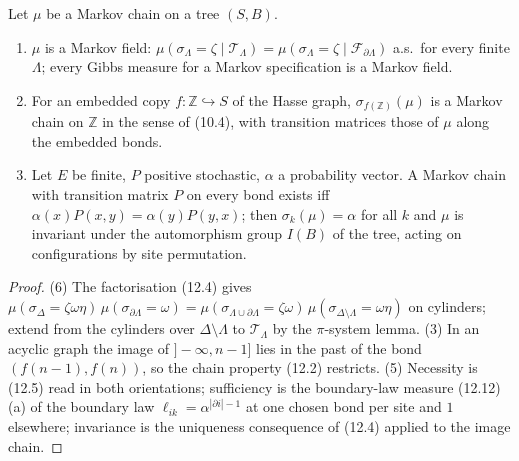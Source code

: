 \begin{proposition}[Georgii (12.3)(3),(5),(6)]
    \label{prop:tr-12-3-b}
    \leanok

    Let $\mu$ be a Markov chain on a tree $(S, B)$.
    \begin{enumerate}
    \item[(6)] $\mu$ is a Markov field: $\mu(\sigma_\Lambda = \zeta \mid \mathcal T_\Lambda) =
      \mu(\sigma_\Lambda = \zeta \mid \mathcal F_{\partial\Lambda})$ a.s.\ for every finite
      $\Lambda$; every Gibbs measure for a Markov specification is a Markov field.
    \item[(3)] For an embedded copy $f : \mathbb Z \hookrightarrow S$ of the Hasse graph,
      $\sigma_{f(\mathbb Z)}(\mu)$ is a Markov chain on $\mathbb Z$ in the sense of (10.4), with
      transition matrices those of $\mu$ along the embedded bonds.
    \item[(5)] Let $E$ be finite, $P$ positive stochastic, $\alpha$ a probability vector. A
      Markov chain with transition matrix $P$ on every bond exists iff $\alpha(x)P(x,y) =
      \alpha(y)P(y,x)$; then $\sigma_k(\mu) = \alpha$ for all $k$ and $\mu$ is invariant under
      the automorphism group $I(B)$ of the tree, acting on configurations by site permutation.
    \end{enumerate}
\end{proposition}
\begin{proof}
    \leanok
    (6) The factorisation (12.4) gives $\mu(\sigma_\Delta = \zeta\omega\eta)\,
    \mu(\sigma_{\partial\Lambda} = \omega) = \mu(\sigma_{\Lambda\cup\partial\Lambda} = \zeta\omega)\,
    \mu(\sigma_{\Delta\setminus\Lambda} = \omega\eta)$ on cylinders; extend from the cylinders
    over $\Delta \setminus \Lambda$ to $\mathcal T_\Lambda$ by the $\pi$-system lemma.
    (3) In an acyclic graph the image of $]-\infty, n-1]$ lies in the past of the bond
    $(f(n-1), f(n))$, so the chain property (12.2) restricts. (5) Necessity is (12.5) read in
    both orientations; sufficiency is the boundary-law measure (12.12)(a) of the boundary law
    $\ell_{ik} = \alpha^{|\partial i| - 1}$ at one chosen bond per site and $1$ elsewhere;
    invariance is the uniqueness consequence of (12.4) applied to the image chain.
\end{proof}

